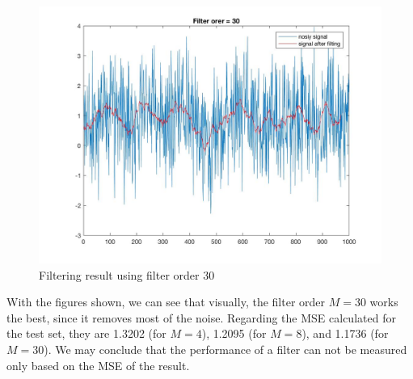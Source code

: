 \documentclass[a4paper]{article}
\begin{document}
\begin{spacing}{2.0}
\begin{figure}[H]
	\centering
	\includegraphics[width=5in]{2_1_30.jpg}
	\caption{Filtering result using filter order 30}
	\label{fig:side:a}
\end{figure}

With the figures shown, we can see that visually, the filter order $M=30$ works the best, since it removes most of the noise. Regarding the MSE calculated for the test set, they are 1.3202 (for $M = 4$), 1.2095 (for $M = 8$), and 1.1736 (for $M = 30$). We may conclude that the performance of a filter can not be measured only based on the MSE of the result.\\


\end{spacing}
\end{document}
